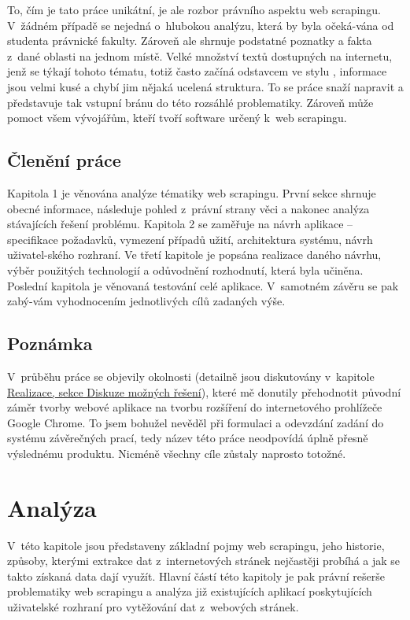 \documentclass[thesis=B,czech]{FITthesis}[2012/06/26]
\begin{document}
\begin{introduction}
	To, čím je tato práce unikátní, je ale rozbor právního aspektu web scrapingu. V~žádném případě se nejedná o~hlubokou analýzu, která by byla očeká-vána od studenta právnické fakulty. Zároveň ale shrnuje podstatné poznatky a fakta z~dané oblasti na jednom místě. Velké množství textů dostupných na internetu, jenž se týkají tohoto tématu, totiž často začíná odstavcem ve stylu , informace jsou velmi kusé a chybí jim nějaká ucelená struktura. To se práce snaží napravit a představuje tak vstupní bránu do této rozsáhlé problematiky. Zároveň může pomoct všem vývojářům, kteří tvoří software určený k~web scrapingu.
	
	\section*{Členění práce}
	Kapitola 1 je věnována analýze tématiky web scrapingu. První sekce shrnuje obecné informace, následuje pohled z~právní strany věci a nakonec analýza stávajících řešení problému. Kapitola 2 se zaměřuje na návrh aplikace -- specifikace požadavků, vymezení případů užití, architektura systému, návrh uživatel-ského rozhraní. Ve třetí kapitole je popsána realizace daného návrhu, výběr použitých technologií a odůvodnění rozhodnutí, která byla učiněna. Poslední kapitola je věnovaná testování celé aplikace. V~samotném závěru se pak zabý-vám vyhodnocením jednotlivých cílů zadaných výše.
	
	\section*{Poznámka}
	V~průběhu práce se objevily okolnosti (detailně jsou diskutovány v~kapitole \hyperref[sec:possible_solutions]{Realizace, sekce Diskuze možných řešení}), které mě donutily přehodnotit původní záměr tvorby webové aplikace na tvorbu rozšíření do internetového prohlížeče Google Chrome. To jsem bohužel nevěděl při formulaci a odevzdání zadání do systému závěrečných prací, tedy název této práce neodpovídá úplně přesně výslednému produktu. Nicméně všechny cíle zůstaly naprosto totožné.
\end{introduction}




\chapter{Analýza}
V~této kapitole jsou představeny základní pojmy web scrapingu, jeho historie, způsoby, kterými extrakce dat z~internetových stránek nejčastěji probíhá a jak se takto získaná data dají využít. Hlavní částí této kapitoly je pak právní rešerše problematiky web scrapingu a analýza již existujících aplikací poskytujících uživatelské rozhraní pro vytěžování dat z~webových stránek.
\end{document}
